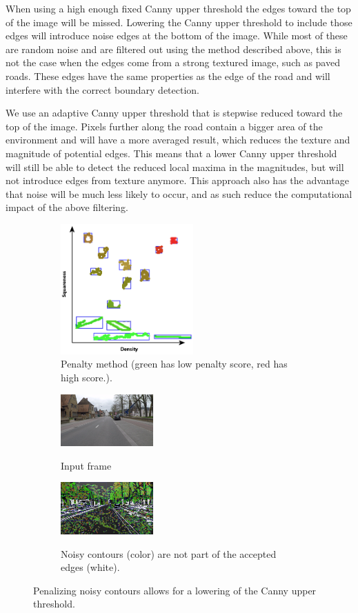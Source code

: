 \documentclass[oneside,english]{llncs}
\begin{document}
When using a high enough fixed Canny upper threshold the edges toward the top of the image will be missed. Lowering the Canny upper threshold to include those edges will introduce noise edges at the bottom of the image. While most of these are random noise and are filtered out using the method described above, this is not the case when the edges come from a strong textured image, such as paved roads. These edges have the same properties as the edge of the road and will interfere with the correct boundary detection. 

We use an adaptive Canny upper threshold that is stepwise reduced toward the top of the image. Pixels further along the road contain a bigger area of the environment and will have a more averaged result, which reduces the texture and magnitude of potential edges. This means that a lower Canny upper threshold will still be able to detect the reduced local maxima in the magnitudes, but will not introduce edges from texture anymore. This approach also has the advantage that noise will be much less likely to occur, and as such reduce the computational impact of the above filtering.

\begin{figure}
    \centering
    \begin{subfigure}[b]{.4\textwidth}
        \includegraphics[width=\textwidth,height=5cm]{canny_contourspenalty}
        \caption{Penalty method (green has low penalty score, red has high score.).} \label{fig:Canny-Penalty-Method}
    \end{subfigure}\qquad
    \begin{subfigure}[b]{.4\textwidth}
        \includegraphics[width=\textwidth,height=2cm]{canny_contourinputframe}
        \caption{Input frame}\label{fig:Canny-Contour-Input}
        \vspace{1ex}
        \includegraphics[width=\textwidth,height=2cm]{canny_treshold15_contourpenalty15}
        \label{fig:Canny-Contour-Output}
        \caption{Noisy contours (color) are not part of the accepted edges (white).}
    \end{subfigure}
\caption{Penalizing noisy contours allows for a lowering of the Canny upper threshold.}
\end{figure}
%
\end{document}
